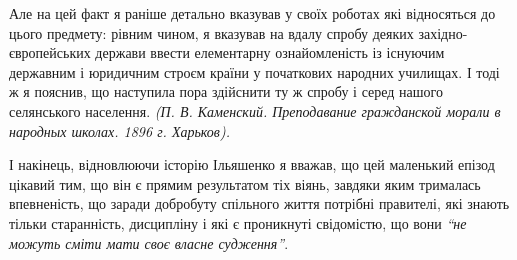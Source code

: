 \documentclass[a4paper,20pt]{report}
\begin{document}
Але на цей факт я раніше детально вказував у своїх роботах які відносяться до цього предмету:
рівним чином, я вказував на вдалу спробу деяких західно-європейських держави ввести елементарну
ознайомленість із існуючим державним і юридичним строєм країни у початкових народних училищах. І тоді
ж я пояснив, що наступила пора здійснити ту ж спробу і серед нашого селянського населення.
\emph{(П. В. Каменский. Преподавание гражданской морали в народных школах. 1896 г. Харьков).}

І накінець, відновлюючи історію Ільяшенко я вважав, що цей маленький епізод
цікавий тим, що він є прямим результатом тіх віянь, завдяки яким трималась впевненість,
що заради добробуту спільного життя потрібні правителі, які знають тільки старанність,
дисципліну і які є проникнуті свідомістю, що вони \emph{``не можуть сміти мати своє власне судження''}.
\end{document}
